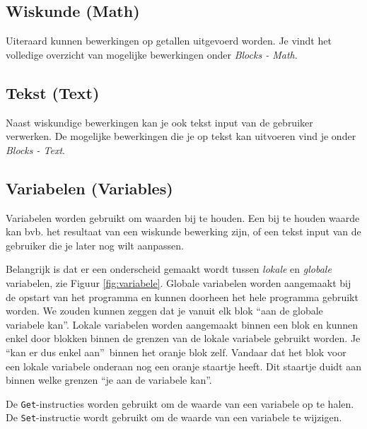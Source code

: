 \subsection{Wiskunde (Math)}
Uiteraard kunnen bewerkingen op getallen uitgevoerd worden. Je vindt het volledige overzicht van mogelijke bewerkingen onder \emph{Blocks - Math}.

\subsection{Tekst (Text)}
Naast wiskundige bewerkingen kan je ook tekst input van de gebruiker verwerken. De mogelijke bewerkingen die je op tekst kan uitvoeren vind je onder \emph{Blocks - Text}.

\subsection{Variabelen (Variables)}
Variabelen worden gebruikt om waarden bij te houden. Een bij te houden waarde kan bvb. het resultaat van een wiskunde bewerking zijn, of een tekst input van de gebruiker die je later nog wilt aanpassen. 

Belangrijk is dat er een onderscheid gemaakt wordt tussen \emph{lokale} en \emph{globale} variabelen, zie Figuur \ref{fig:variabele}. Globale variabelen worden aangemaakt bij de opstart van het programma en kunnen doorheen het hele programma gebruikt worden. We zouden kunnen zeggen dat je vanuit elk blok \textquotedblleft aan de globale variabele kan\textquotedblright.
Lokale variabelen worden aangemaakt binnen een blok en kunnen enkel door blokken binnen de grenzen van de lokale variabele gebruikt worden. Je \textquotedblleft kan er dus enkel aan\textquotedblright \ binnen het oranje blok zelf. Vandaar dat het blok voor een lokale variabele onderaan nog een oranje staartje heeft. Dit staartje duidt aan binnen welke grenzen \textquotedblleft je aan de variabele kan\textquotedblright.


De \texttt{Get}-instructies worden gebruikt om de waarde van een variabele op te halen. De \texttt{Set}-instructie wordt gebruikt om de waarde van een variabele te wijzigen.

